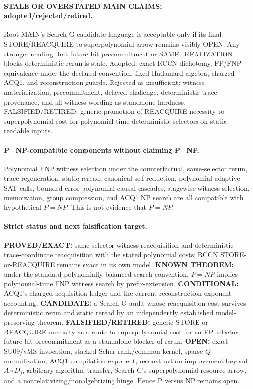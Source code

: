 \documentclass[11pt]{article}
\begin{document}
\paragraph{STALE OR OVERSTATED MAIN CLAIMS; adopted/rejected/retired.}
Root MAIN's Search-G candidate language is acceptable only if its final STORE/REACQUIRE-to-superpolynomial arrow remains visibly OPEN. Any stronger reading that future-bit precommitment or SAME\_REALIZATION blocks deterministic rerun is stale. Adopted: exact RCCN dichotomy, FP/FNP equivalence under the declared convention, fixed-Hadamard algebra, charged ACQ1, and reconstruction guards. Rejected as insufficient: witness materialization, precommitment, delayed challenge, deterministic trace provenance, and all-witness wording as standalone hardness. FALSIFIED/RETIRED: generic promotion of REACQUIRE necessity to superpolynomial cost for polynomial-time deterministic selectors on static readable inputs.

\paragraph{P=NP-compatible components without claiming P=NP.}
Polynomial FNP witness selection under the counterfactual, same-selector rerun, trace regeneration, static reread, canonical self-reduction, polynomial adaptive SAT calls, bounded-error polynomial causal cascades, stagewise witness selection, memoization, group compression, and ACQ1 NP search are all compatible with hypothetical $P=NP$. This is not evidence that $P=NP$.

\paragraph{Strict status and next falsification target.}
\textbf{PROVED/EXACT:} same-selector witness reacquisition and deterministic trace-coordinate reacquisition with the stated polynomial costs; RCCN STORE-or-REACQUIRE remains exact in its own model.
\textbf{KNOWN THEOREM:} under the standard polynomially balanced search convention, $P=NP$ implies polynomial-time FNP witness search by prefix-extension.
\textbf{CONDITIONAL:} ACQ1's charged acquisition ledger and the current reconstruction exponent accounting.
\textbf{CANDIDATE:} a Search-G audit whose reacquisition cost survives deterministic rerun and static reread by an independently established model-preserving theorem.
\textbf{FALSIFIED/RETIRED:} generic STORE-or-REACQUIRE necessity as a route to superpolynomial cost for an FP selector; future-bit precommitment as a standalone blocker of rerun.
\textbf{OPEN:} exact SU09/vMS invocation, stacked Schur rank/common kernel, sparse-$Q$ normalization, ACQ1 compilation exponent, reconstruction improvement beyond $A\circ D_j$, arbitrary-algorithm transfer, Search-G's superpolynomial resource arrow, and a nonrelativizing/nonalgebrizing hinge. Hence P versus NP remains open.
\end{document}
